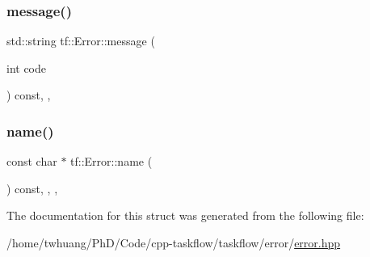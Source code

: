 \mbox{\label{structtf_1_1Error_ae2d8630128262023502664f3cae5daab}} 
\subsubsection{\texorpdfstring{message()}{message()}}
{\footnotesize\ttfamily std\+::string tf\+::\+Error\+::message (\begin{DoxyParamCaption}\item[{int}]{code }\end{DoxyParamCaption}) const\hspace{0.3cm}{\ttfamily [inline]}, {\ttfamily [final]}, {\ttfamily [override]}}

\mbox{\label{structtf_1_1Error_a18a5c2f16b543d5361e8a24554ebd12c}} 
\subsubsection{\texorpdfstring{name()}{name()}}
{\footnotesize\ttfamily const char $\ast$ tf\+::\+Error\+::name (\begin{DoxyParamCaption}{ }\end{DoxyParamCaption}) const\hspace{0.3cm}{\ttfamily [inline]}, {\ttfamily [final]}, {\ttfamily [override]}, {\ttfamily [noexcept]}}



The documentation for this struct was generated from the following file\+:\begin{DoxyCompactItemize}
\item 
/home/twhuang/\+Ph\+D/\+Code/cpp-\/taskflow/taskflow/error/\hyperlink{error_8hpp}{error.\+hpp}\end{DoxyCompactItemize}
